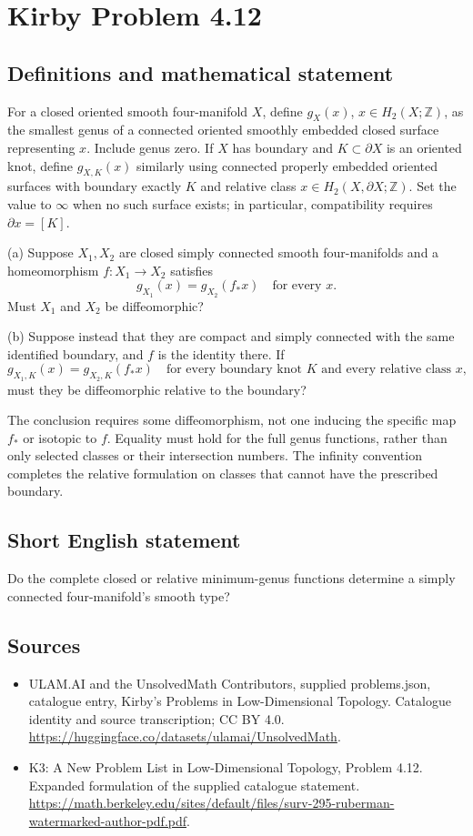 \documentclass[11pt,a4paper]{article}
\begin{document}
\section*{Kirby Problem 4.12}\label{statement}

\subsection{Definitions and mathematical statement}
For a closed oriented smooth four-manifold $X$, define $g_X(x)$, $x\in H_2(X;\mathbb Z)$, as the smallest genus of a connected oriented smoothly embedded closed surface representing $x$. Include genus zero. If $X$ has boundary and $K\subset\partial X$ is an oriented knot, define $g_{X,K}(x)$ similarly using connected properly embedded oriented surfaces with boundary exactly $K$ and relative class $x\in H_2(X,\partial X;\mathbb Z)$. Set the value to $\infty$ when no such surface exists; in particular, compatibility requires $\partial x=[K]$.

(a) Suppose $X_1,X_2$ are closed simply connected smooth four-manifolds and a homeomorphism $f:X_1\to X_2$ satisfies
\[
g_{X_1}(x)=g_{X_2}(f_*x)\quad\text{for every }x.
\]
Must $X_1$ and $X_2$ be diffeomorphic?

(b) Suppose instead that they are compact and simply connected with the same identified boundary, and $f$ is the identity there. If
\[
g_{X_1,K}(x)=g_{X_2,K}(f_*x)
\quad\text{for every boundary knot }K\text{ and every relative class }x,
\]
must they be diffeomorphic relative to the boundary?

The conclusion requires some diffeomorphism, not one inducing the specific map $f_*$ or isotopic to $f$. Equality must hold for the full genus functions, rather than only selected classes or their intersection numbers. The infinity convention completes the relative formulation on classes that cannot have the prescribed boundary.
\subsection{Short English statement}
Do the complete closed or relative minimum-genus functions determine a simply connected four-manifold's smooth type?
\subsection{Sources}
\begin{itemize}
\item[S1] ULAM.AI and the UnsolvedMath Contributors, supplied problems.json, catalogue entry, Kirby's Problems in Low-Dimensional Topology. Catalogue identity and source transcription; CC BY 4.0.
\url{https://huggingface.co/datasets/ulamai/UnsolvedMath}.
\item[S2] K3: A New Problem List in Low-Dimensional Topology, Problem 4.12. Expanded formulation of the supplied catalogue statement.
\url{https://math.berkeley.edu/sites/default/files/surv-295-ruberman-watermarked-author-pdf.pdf}.
\end{itemize}
\end{document}
